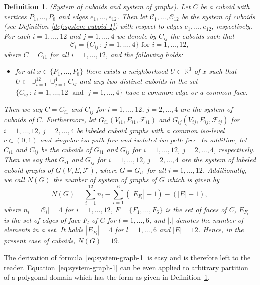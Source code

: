 \documentclass[a4paper,11pt]{article}
\newtheorem{definition}[theorem]{Definition}
\begin{document}
\begin{definition}(System of cuboids and system of graphs).  Let $C$ be a cuboid with vertices
$P_1,\ldots,P_8$ and edges $e_1,\ldots,e_{12}$. Then let $\mathcal{C}_1,\ldots,\mathcal{C}_{12}$
be the system of cuboids (see Definition \ref{def:system-cuboid-1}) with respect to edges
$e_1,\ldots,e_{12}$, respectively. For each $i=1,\ldots,12$ and $j=1,\ldots,4$ we denote by
$C_{ij}$ the cuboids such that
\[
\mathcal{C}_i=\{C_{ij}\,:\,j=1,\ldots,4\} \mbox{ for } i=1,\ldots,12,
\]
where $C=C_{i1}$ for all $i=1,\ldots,12$, and the following holds:
\begin{itemize}
\item for all $x\in \{P_1,\ldots,P_8\}$ there exists a neighborhood $U\subset\mathbb{R}^3$ of $x$
      such that $U\subset \cup_{i=1}^{12}\cup_{j=1}^{4}C_{ij}$ and any two distinct cuboids
      in the set $\{C_{ij}\,:\,i=1,\ldots,12\; \mbox{ and }\; j=1,\ldots,4\}$ have a common edge
      or a common face.
\end{itemize}
Then we say $C=C_{i1}$ and $C_{ij}$ for $i=1,\ldots,12$, $j=2,\ldots,4$ are the system of cuboids
of $C$. Furthermore, let $G_{i1}(V_{i1},E_{i1},\mathcal{F}_{i1})$ and $G_{ij}(V_{ij},E_{ij},
\mathcal{F}_{ij})$ for $i=1,\ldots,12$, $j=2,\ldots,4$ be labeled cuboid graphs with a common
iso-level $c\in (0,1)$ and singular iso-path free and isolated iso-path free. In addition, let
$C_{i1}$ and $C_{ij}$ be the cuboids of $G_{i1}$ and $G_{ij}$ for $i=1,\ldots,12$, $j=2,\ldots,4$,
respectively. Then we say that $G_{i1}$ and $G_{ij}$ for $i=1,\ldots,12$, $j=2,\ldots,4$ are the
system of labeled cuboid graphs of $G(V,E,\mathcal{F})$, where $G=G_{i1}$ for all $i=1,\ldots,12$.
Additionally, we call $N(G)$ the number of system of graphs of $G$ which is given by
\begin{equation}
N(G)=\sum_{i=1}^{12}n_i-\sum_{l=1}^6(|E_{F_l}|-1)-(|E|-1),
\label{eq:system-graph-1}
\end{equation}
where $n_i=|\mathcal{C}_i|=4$ for $i=1,\ldots,12$, $F=\{F_1,\ldots,F_6\}$ is the set of faces of
$C$, $E_{F_l}$ is the set of edges of face $F_l$ of $C$ for $l=1,\ldots,6$, and $|.|$ denotes
the number of elements in a set. It holds $|E_{F_l}|=4$ for $l=1,\ldots,6$ and $|E|=12$. Hence,
in the present case of cuboids, $N(G)=19$.
\label{def:curve-1}
\end{definition}
The derivation of formula~\eqref{eq:system-graph-1} is easy and is therefore left to the reader.
Equation~\eqref{eq:system-graph-1} can be even applied to arbitrary partition
of a polygonal domain which has the form as given in Definition~\ref{def:curve-1}.
\end{document}
